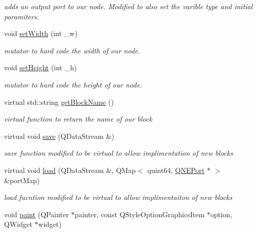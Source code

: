 \begin{DoxyCompactItemize}
\begin{DoxyCompactList}\small\item\em adds an output port to our node. Modified to also set the varible type and initial paramiters. \end{DoxyCompactList}\item 
\hypertarget{class_q_n_e_block_a7af0502c39a078dc58dfb80703492f37}{void \hyperlink{class_q_n_e_block_a7af0502c39a078dc58dfb80703492f37}{set\-Width} (int \-\_\-w)}\label{class_q_n_e_block_a7af0502c39a078dc58dfb80703492f37}

\begin{DoxyCompactList}\small\item\em mutator to hard code the width of our node. \end{DoxyCompactList}\item 
\hypertarget{class_q_n_e_block_a9e67e1fafb2a8f23e24848a084f0884f}{void \hyperlink{class_q_n_e_block_a9e67e1fafb2a8f23e24848a084f0884f}{set\-Height} (int \-\_\-h)}\label{class_q_n_e_block_a9e67e1fafb2a8f23e24848a084f0884f}

\begin{DoxyCompactList}\small\item\em mutator to hard code the height of our node. \end{DoxyCompactList}\item 
\hypertarget{class_q_n_e_block_ac4108ddff3e3e0c8825238fff81d5811}{virtual std\-::string \hyperlink{class_q_n_e_block_ac4108ddff3e3e0c8825238fff81d5811}{get\-Block\-Name} ()}\label{class_q_n_e_block_ac4108ddff3e3e0c8825238fff81d5811}

\begin{DoxyCompactList}\small\item\em virtual function to return the name of our block \end{DoxyCompactList}\item 
\hypertarget{class_q_n_e_block_adef2de51ebb7558e61205b535fbebb49}{virtual void \hyperlink{class_q_n_e_block_adef2de51ebb7558e61205b535fbebb49}{save} (Q\-Data\-Stream \&)}\label{class_q_n_e_block_adef2de51ebb7558e61205b535fbebb49}

\begin{DoxyCompactList}\small\item\em save function modified to be virtual to allow implimentation of new blocks \end{DoxyCompactList}\item 
virtual void \hyperlink{class_q_n_e_block_ab7fb118bd4bcf8aa224d03807a6dc315}{load} (Q\-Data\-Stream \&, Q\-Map$<$ quint64, \hyperlink{class_q_n_e_port}{Q\-N\-E\-Port} $\ast$ $>$ \&port\-Map)
\begin{DoxyCompactList}\small\item\em load fucntion modified to be virtual to allow implimentaiton of new blocks \end{DoxyCompactList}\item 
\hypertarget{class_q_n_e_block_ad30bdf5493a7fefa49747b147fd655d4}{void \hyperlink{class_q_n_e_block_ad30bdf5493a7fefa49747b147fd655d4}{paint} (Q\-Painter $\ast$painter, const Q\-Style\-Option\-Graphics\-Item $\ast$option, Q\-Widget $\ast$widget)}\label{class_q_n_e_block_ad30bdf5493a7fefa49747b147fd655d4}


\end{DoxyCompactItemize}

